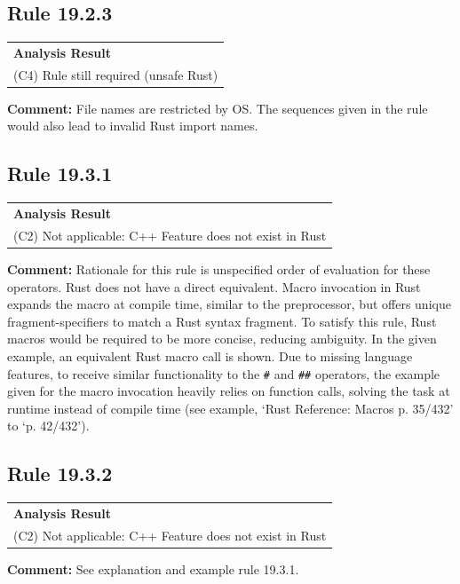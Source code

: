 \subsection*{Rule 19.2.3}
\begin{longtable}{p{13cm}}
\textbf{Analysis Result} \\
(C4) Rule still required (unsafe Rust) \\
\end{longtable}
\textbf{Comment:} File names are restricted by OS. The sequences given in the rule would also lead to invalid Rust import names. \\
\subsection*{Rule 19.3.1}
\begin{longtable}{p{13cm}}
\textbf{Analysis Result} \\
(C2) Not applicable: C++ Feature does not exist in Rust \\
\end{longtable}
\textbf{Comment:} Rationale for this rule is unspecified order of evaluation for these operators. Rust does not have a direct equivalent. Macro invocation in Rust expands the macro at compile time, similar to the \Cpp preprocessor, but offers unique fragment-specifiers to match a Rust syntax fragment. To satisfy this rule, Rust macros would be required to be more concise, reducing ambiguity. In the given example, an equivalent Rust macro call is shown. Due to missing language features, to receive similar functionality to the \texttt{\#} and \texttt{\#\#} operators, the example given for the macro invocation heavily relies on function calls, solving the task at runtime instead of compile time (see example, `Rust Reference: Macros p. 35/432' to `p. 42/432'). \\


\subsection*{Rule 19.3.2}
\begin{longtable}{p{13cm}}
\textbf{Analysis Result} \\
(C2) Not applicable: C++ Feature does not exist in Rust \\
\end{longtable}
\textbf{Comment:} See explanation and example rule 19.3.1. \\
